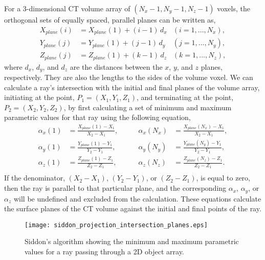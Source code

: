 For a 3-dimensional CT volume array of $(N_x -1, N_y-1, N_z-1)$ voxels, the orthogonal sets of equally spaced, parallel planes can be written as,
%
\begin{equation}
	\begin{aligned}
		X_{plane}(i) & = X_{plane}(1) + (i-1)\, d_x 	&(i = 1, ..., N_x),\\ 
		Y_{plane}(j) & = Y_{plane}(1) + (j-1)\, d_y  	&(j = 1, ..., N_y),\\
		Z_{plane}(j) & = Z_{plane}(1) + (k-1)\, d_z		&(k = 1, ..., N_z),
	\end{aligned}
	\label{eq:siddon_planes}
\end{equation}
%
where $d_x$, $d_y$, and $d_z$ are the distances between the $x$, $y$, and $z$ planes, respectively.  They are also the lengths to the sides of the volume voxel.  We can calculate a ray's intersection with the initial and final planes of the volume array, initiating at the point, $P_1 = (X_1, Y_1, Z_1)$, and terminating at the point, $P_2 = (X_2, Y_2, Z_2)$, by first calculating a set of minimum and maximum parametric values for that ray using the following equation,
%
\begin{equation}
\begin{aligned}
\alpha_x(1) &= \frac{X_{plane}(1) - X_1}{X_2 - X_1}, \qquad &\alpha_x(N_x) &= \frac{X_{plane}(N_x) - X_1}{X_2 - X_1}, \\
\alpha_y(1) &= \frac{Y_{plane}(1) - Y_1}{Y_2 - Y_1}, \qquad &\alpha_y(N_y) &= \frac{Y_{plane}(N_y) - Y_1}{Y_2 - Y_1}, \\
\alpha_z(1) &= \frac{Z_{plane}(1) - Z_1}{Z_2 - Z_1}, \qquad &\alpha_z(N_z) &= \frac{Z_{plane}(N_z) - Z_1}{Z_2 - Z_1}. \\
\end{aligned}
\label{eq:siddon_alpha_extremes}
\end{equation}
%
If the denominator, $(X_2 - X_1)$, $(Y_2-Y_1)$, or $(Z_2 - Z_1)$, is equal to zero, then the ray is parallel to that particular plane, and the corresponding $\alpha_x$, $\alpha_y$, or $\alpha_z$ will be undefined and excluded from the calculation.  These equations calculate the surface planes of the CT volume against the initial and final points of the ray.
%
\begin{figure}[ht]
\centering
\texttt{[image: siddon\_projection\_intersection\_planes.eps]}
\caption[Siddon's algorithm showing the minimum and maximum parametric values for a ray passing through a 2D object array.]{Siddon's algorithm showing the minimum and maximum parametric values for a ray passing through a 2D object array.}
\label{fig:siddon_intersection_planes}
\end{figure}

